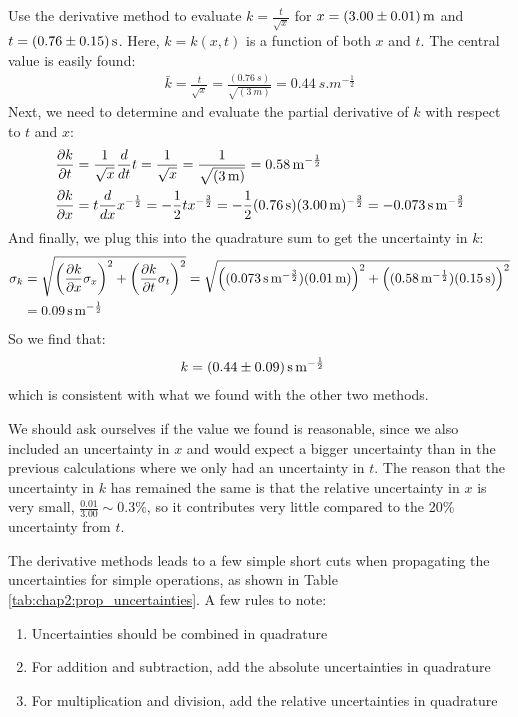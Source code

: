\begin{example}{Use the derivative method to evaluate $k=\frac{t}{\sqrt{x}}$ for $x=\SI{3.00 \pm 0.01}{m}$ and $t=\SI{0.76\pm0.15}{s}$.}
\label{ex:Chap2:derivprop}
Here, $k=k(x,t)$ is a function of both $x$ and $t$. The central value is easily found:
\begin{align*}
\bar k = \frac{t}{\sqrt{x}} = \frac{(\SI{0.76}{s})}{\sqrt{(\SI{3}{m})}}=\SI{0.44}{s.m^{-\frac{1}{2}}}\end{align*}
Next, we need to determine and evaluate the partial derivative of $k$ with respect to $t$ and $x$:
\begin{align*}
\frac{\partial k}{\partial t}&=\frac{1}{\sqrt{x}}\frac{d}{dt}t=\frac{1}{\sqrt{x}}=\frac{1}{\sqrt{(\SI{3}{m})}}=\SI{0.58}{m^{-\frac{1}{2}}}\\
\frac{\partial k}{\partial x}&=t\frac{d}{dx}x^{-\frac{1}{2}}=-\frac{1}{2}tx^{-\frac{3}{2}}= -\frac{1}{2}(\SI{0.76}{s})(\SI{3.00}{m})^{-\frac{3}{2}}=-\SI{0.073}{s.m^{-\frac{3}{2}}}
\end{align*}
And finally, we plug this into the quadrature sum to get the uncertainty in $k$:
\begin{align*}
\sigma_k&=\sqrt{\left(\frac{\partial k}{\partial x}\sigma_x \right)^2 + \left(\frac{\partial k}{\partial t}\sigma_t \right)^2 } = \sqrt{\left((\SI{0.073}{s.m^{-\frac{3}{2}}}) (\SI{0.01}{m}) \right)^2 + \left((\SI{0.58}{m^{-\frac{1}{2}}})(\SI{0.15}{s}) \right)^2 } \\
&=\SI{0.09}{s.m^{-\frac{1}{2}}}
\end{align*}
So we find that:
\begin{align*}
k&= \SI{0.44 \pm 0.09}{s.m^{-\frac{1}{2}}}
\end{align*}
which is consistent with what we found with the other two methods.

We should ask ourselves if the value we found is reasonable, since we also included an uncertainty in $x$ and would expect a bigger uncertainty than in the previous calculations where we only had an uncertainty in $t$. The reason that the uncertainty in $k$ has remained the same is that the relative uncertainty in $x$ is very small, $\frac{0.01}{3.00}\sim 0.3\%$, so it contributes very little compared to the 20\% uncertainty from $t$. 
\end{example}

The derivative methods leads to a few simple short cuts when propagating the uncertainties for simple operations, as shown in Table \ref{tab:chap2:prop_uncertainties}. A few rules to note:
\begin{enumerate}
\item Uncertainties should be combined in quadrature
\item For addition and subtraction, add the absolute uncertainties in quadrature
\item For multiplication and division, add the relative uncertainties in quadrature
\end{enumerate}

